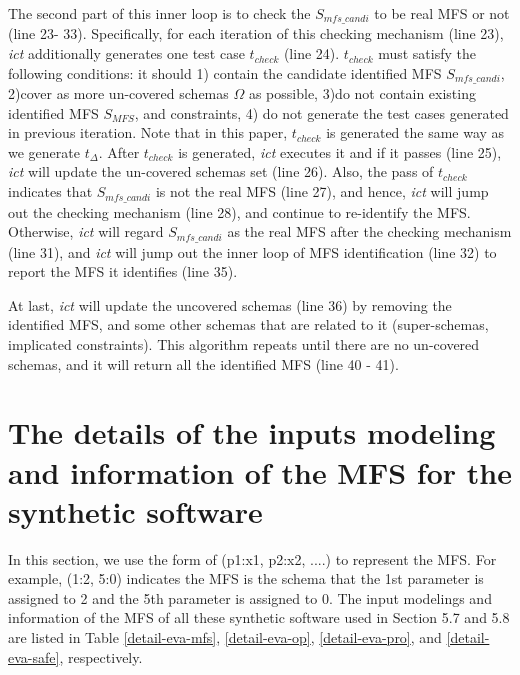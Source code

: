 \documentclass[10pt,journal,compsoc]{IEEEtran}
\begin{document}
The second part of this inner loop is to check the $S_{mfs\_candi}$ to be real MFS or not (line 23- 33). Specifically, for each iteration of this checking mechanism (line 23), \emph{ict} additionally generates one test case $t_{check}$ (line 24). $t_{check}$ must satisfy the following conditions: it should 1) contain the candidate identified MFS $S_{mfs\_candi}$, 2)cover as more un-covered schemas $\Omega$ as possible,  3)do not contain existing identified MFS $S_{MFS}$,  and constraints, 4) do not generate the  test cases generated in previous iteration. Note that in this paper, $t_{check}$ is generated the same way as we generate $t_{\Delta}$. After $t_{check}$ is generated, \emph{ict} executes it and if it passes (line 25), \emph{ict} will update the un-covered schemas set (line 26). Also, the pass of $t_{check}$ indicates that $S_{mfs\_candi}$ is not the real MFS (line 27), and hence, \emph{ict} will jump out the checking mechanism (line 28), and continue to re-identify the MFS. Otherwise, \emph{ict} will regard $S_{mfs\_candi}$  as the real MFS after the checking  mechanism (line 31), and \emph{ict} will jump out the inner loop of MFS identification (line 32) to report the MFS it identifies (line 35).

At last, \emph{ict} will update the uncovered schemas (line 36) by removing the identified MFS, and some other schemas that are related to it (super-schemas, implicated constraints). This algorithm repeats until there are no un-covered schemas, and it will return all the identified MFS (line 40 - 41).



\section{The details of the inputs modeling and information of the MFS for the synthetic software}
In this section, we use the form of (p1:x1, p2:x2, ....) to represent the MFS. For example, (1:2, 5:0) indicates the MFS is the schema that the 1st parameter is assigned to 2 and the 5th parameter is assigned to 0. The input modelings and information of the MFS of all these synthetic software used in Section 5.7 and 5.8 are listed in Table \ref{detail-eva-mfs}, \ref{detail-eva-op}, \ref{detail-eva-pro}, and \ref{detail-eva-safe}, respectively.
\setcounter{table}{30}

%    
\end{document}
